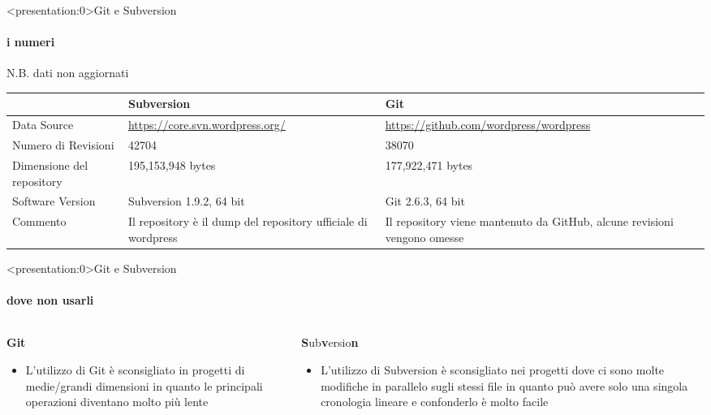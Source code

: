 \documentclass[aspectratio=169,handout,10pt]{beamer}
\begin{document}
\begin{frame}<presentation:0>{Git e Subversion}
    \framesubtitle{i numeri}
    N.B. dati non aggiornati
    \begin{table}
        \begin{tabular}{|p{}|p{}|p{}|}
            \hline & Subversion & Git \\
            \hline Data Source & \url{https://core.svn.wordpress.org/} & \url{https://github.com/wordpress/wordpress} \\
            \hline Numero di Revisioni & 42704 & 38070 \\
            \hline Dimensione del repository  & 195,153,948 bytes & 177,922,471 bytes \\
            \hline Software Version & Subversion 1.9.2, 64 bit & Git 2.6.3, 64 bit \\
            \hline Commento & Il repository è il dump  del repository ufficiale  di wordpress & Il repository viene mantenuto da GitHub, alcune revisioni vengono omesse \\
            \hline
        \end{tabular}
    \end{table}
\end{frame}

\begin{frame}<presentation:0>{Git e Subversion}
    \framesubtitle{dove non usarli}
    \begin{columns}
        \begin{column}{0.5\textwidth}
            \textbf{Git}
            \begin{itemize}
                \item L'utilizzo di Git è sconsigliato in progetti di medie/grandi dimensioni in quanto le principali operazioni diventano molto più lente    
            \end{itemize}            
        \end{column}
        \begin{column}{0.5\textwidth}
            \textbf{S}ub\textbf{v}ersio\textbf{n} 
            \begin{itemize}
                \item L'utilizzo di Subversion è sconsigliato nei progetti dove ci sono molte modifiche in parallelo sugli stessi file in quanto può avere solo una singola cronologia lineare e confonderlo è molto facile
            \end{itemize}
        \end{column}
    \end{columns}
\end{frame}
\end{document}
